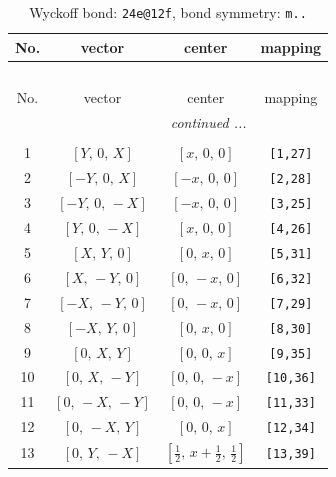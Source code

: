 \documentclass[fleqn,8pt]{jsarticle}
\begin{document}
\begin{longtable}{cccc}
\caption{Wyckoff bond: {\tt 24e@12f}, bond symmetry: {\tt m..}}
 \\
 \hline \hline
No. & vector & center & mapping \\ \hline \endfirsthead

\multicolumn{3}{l}{\tablename\ \thetable{}} \\
 \hline \hline
No. & vector & center & mapping \\ \hline \endhead

 \hline \hline
\multicolumn{3}{r}{\footnotesize\it continued ...} \\ \endfoot

 \hline \hline
\multicolumn{3}{r}{} \\ \endlastfoot

1 & $\left[ Y,\, 0,\, X \right]$ & $\left[ x,\, 0,\, 0 \right]$ & {\tt [1,27]} \\ \hline
2 & $\left[ - Y,\, 0,\, X \right]$ & $\left[ - x,\, 0,\, 0 \right]$ & {\tt [2,28]} \\ \hline
3 & $\left[ - Y,\, 0,\, - X \right]$ & $\left[ - x,\, 0,\, 0 \right]$ & {\tt [3,25]} \\ \hline
4 & $\left[ Y,\, 0,\, - X \right]$ & $\left[ x,\, 0,\, 0 \right]$ & {\tt [4,26]} \\ \hline
5 & $\left[ X,\, Y,\, 0 \right]$ & $\left[ 0,\, x,\, 0 \right]$ & {\tt [5,31]} \\ \hline
6 & $\left[ X,\, - Y,\, 0 \right]$ & $\left[ 0,\, - x,\, 0 \right]$ & {\tt [6,32]} \\ \hline
7 & $\left[ - X,\, - Y,\, 0 \right]$ & $\left[ 0,\, - x,\, 0 \right]$ & {\tt [7,29]} \\ \hline
8 & $\left[ - X,\, Y,\, 0 \right]$ & $\left[ 0,\, x,\, 0 \right]$ & {\tt [8,30]} \\ \hline
9 & $\left[ 0,\, X,\, Y \right]$ & $\left[ 0,\, 0,\, x \right]$ & {\tt [9,35]} \\ \hline
10 & $\left[ 0,\, X,\, - Y \right]$ & $\left[ 0,\, 0,\, - x \right]$ & {\tt [10,36]} \\ \hline
11 & $\left[ 0,\, - X,\, - Y \right]$ & $\left[ 0,\, 0,\, - x \right]$ & {\tt [11,33]} \\ \hline
12 & $\left[ 0,\, - X,\, Y \right]$ & $\left[ 0,\, 0,\, x \right]$ & {\tt [12,34]} \\ \hline
13 & $\left[ 0,\, Y,\, - X \right]$ & $\left[ \frac{1}{2},\, x + \frac{1}{2},\, \frac{1}{2} \right]$ & {\tt [13,39]} \\ \hline

\end{longtable}
\end{document}
